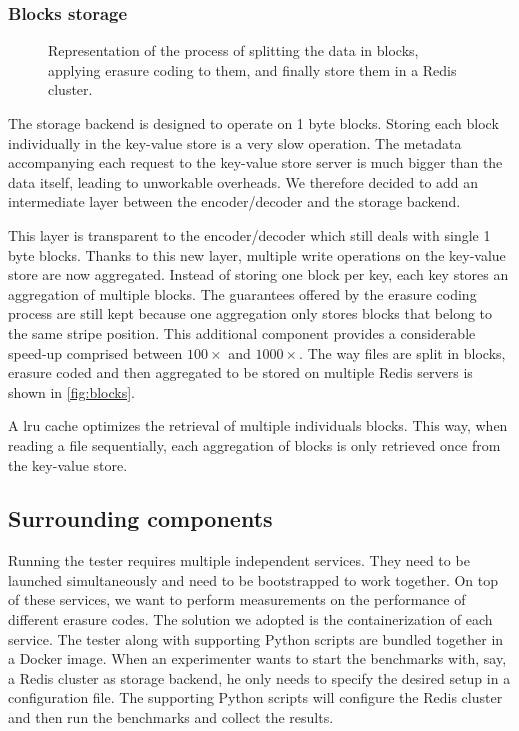 \subsubsection{Blocks storage}

\begin{figure}[H]
    \centering
    
    \caption{Representation of the process of splitting the data in blocks, applying erasure coding to them, and finally store them in a Redis cluster.}
    \label{fig:blocks}
\end{figure}

The storage backend is designed to operate on 1 byte blocks.
Storing each block individually in the key-value store is a very slow operation.
The metadata accompanying each request to the key-value store server is much bigger than the data itself, leading to unworkable overheads.
We therefore decided to add an intermediate layer between the encoder/decoder and the storage backend.

This layer is transparent to the encoder/decoder which still deals with single 1 byte blocks.
Thanks to this new layer, multiple write operations on the key-value store are now aggregated.
Instead of storing one block per key, each key stores an aggregation of multiple blocks.
The guarantees offered by the erasure coding process are still kept because one aggregation only stores blocks that belong to the same stripe position.
This additional component provides a considerable speed-up comprised between $100\times$ and $1000\times$.
The way files are split in blocks, erasure coded and then aggregated to be stored on multiple Redis servers is shown in \autoref{fig:blocks}.

A \ac{lru} cache optimizes the retrieval of multiple individuals blocks.
This way, when reading a file sequentially, each aggregation of blocks is only retrieved once from the key-value store.

\subsection{Surrounding components}

Running the tester requires multiple independent services.
They need to be launched simultaneously and need to be bootstrapped to work together.
On top of these services, we want to perform measurements on the performance of different erasure codes.
The solution we adopted is the containerization of each service.
The tester along with supporting Python scripts are bundled together in a Docker image.
When an experimenter wants to start the benchmarks with, say, a Redis cluster as storage backend, he only needs to specify the desired setup in a configuration file.
The supporting Python scripts will configure the Redis cluster and then run the benchmarks and collect the results.

